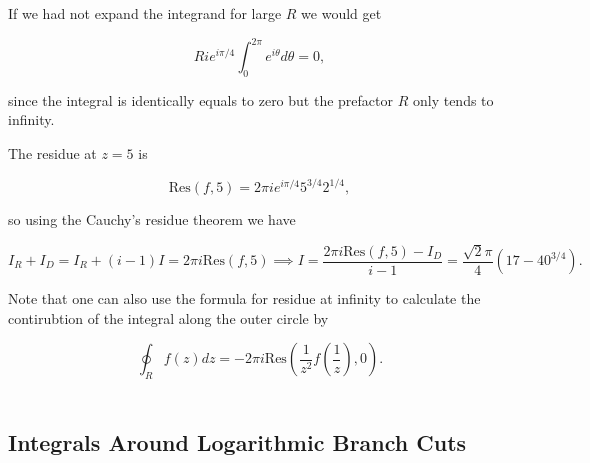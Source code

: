 \documentclass[english,a4paper,12pt]{report}
\begin{document}
{If we had not expand the integrand for large \(R\) we would get 

\begin{equation}
    Ri e^{i \pi /4} \int_{0}^{2\pi } e^{i \theta } d\theta  = 0, 
\end{equation}

since the integral is identically equals to zero but the prefactor \(R\) only tends to infinity.

The residue at \(z = 5\) is 

\begin{equation}
    \text{Res} (f,5) = 2\pi i e^{i \pi /4} 5^{3/4} 2^{1/4},    
\end{equation}

so using the Cauchy's residue theorem we have 

\begin{equation}
    I_{R} + I_{D} = I_{R} + (i-1)I =  2\pi i\text{Res}(f,5) \implies I = \frac{2\pi i\text{Res}(f,5) - I_{D} }{i-1} = \frac{\sqrt{2} \pi }{4} (17-40^{3/4} ). 
\end{equation}

Note that one can also use the formula for residue at infinity to calculate the contirubtion of the integral along the outer circle by 

\begin{equation}
    \oint_{R} f(z)dz = -2\pi i \text{Res}\left( \frac{1}{z^2}f\left(\frac{1}{z} \right),0  \right).
\end{equation}
~
}

\subsection{Integrals Around Logarithmic Branch Cuts}
\end{document}
